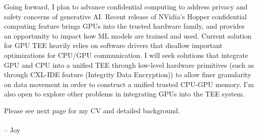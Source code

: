 \vspace{3ex}
Going forward, I plan to advance confidential computing to address privacy and safety concerns of generative AI. Recent release of NVidia's Hopper confidential computing feature brings GPUs into the trusted hardware family, and provides an opportunity to impact how ML models are trained and used. Current solution for GPU TEE heavily relies on software drivers that disallow important optimizations for CPU/GPU communication. I will seek solutions that integrate GPU and CPU into a unified TEE through low-level hardware primitives (such as through CXL-IDE feature (Integrity Data Encryption)) to allow finer granularity on data movement in order to construct a unified trusted CPU-GPU memory. I'm also open to explore other problems in integrating GPUs into the TEE system. \\

\vspace{3ex}

Please see next page for my CV and detailed background. \\
\paragraph*{}
\begin{flushright} -- Joy\end{flushright}
